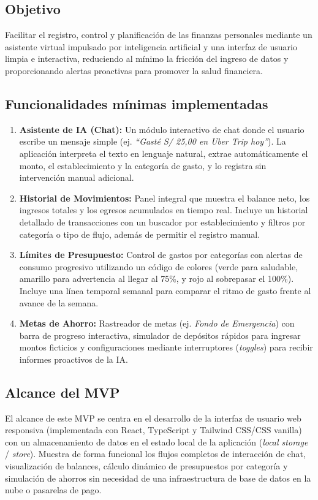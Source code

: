 \documentclass[12pt]{article}
\begin{document}
\subsection{Objetivo}
Facilitar el registro, control y planificación de las finanzas personales mediante un asistente virtual impulsado por inteligencia artificial y una interfaz de usuario limpia e interactiva, reduciendo al mínimo la fricción del ingreso de datos y proporcionando alertas proactivas para promover la salud financiera.

\subsection{Funcionalidades mínimas implementadas}
\begin{enumerate}
    \item \textbf{Asistente de IA (Chat):} Un módulo interactivo de chat donde el usuario escribe un mensaje simple (ej. \textit{``Gasté S/ 25,00 en Uber Trip hoy''}). La aplicación interpreta el texto en lenguaje natural, extrae automáticamente el monto, el establecimiento y la categoría de gasto, y lo registra sin intervención manual adicional.
    \item \textbf{Historial de Movimientos:} Panel integral que muestra el balance neto, los ingresos totales y los egresos acumulados en tiempo real. Incluye un historial detallado de transacciones con un buscador por establecimiento y filtros por categoría o tipo de flujo, además de permitir el registro manual.
    \item \textbf{Límites de Presupuesto:} Control de gastos por categorías con alertas de consumo progresivo utilizando un código de colores (verde para saludable, amarillo para advertencia al llegar al 75\%, y rojo al sobrepasar el 100\%). Incluye una línea temporal semanal para comparar el ritmo de gasto frente al avance de la semana.
    \item \textbf{Metas de Ahorro:} Rastreador de metas (ej. \textit{Fondo de Emergencia}) con barra de progreso interactiva, simulador de depósitos rápidos para ingresar montos ficticios y configuraciones mediante interruptores (\textit{toggles}) para recibir informes proactivos de la IA.
\end{enumerate}

\subsection{Alcance del MVP}
El alcance de este MVP se centra en el desarrollo de la interfaz de usuario web responsiva (implementada con React, TypeScript y Tailwind CSS/CSS vanilla) con un almacenamiento de datos en el estado local de la aplicación (\textit{local storage} / \textit{store}). Muestra de forma funcional los flujos completos de interacción de chat, visualización de balances, cálculo dinámico de presupuestos por categoría y simulación de ahorros sin necesidad de una infraestructura de base de datos en la nube o pasarelas de pago.
\end{document}
